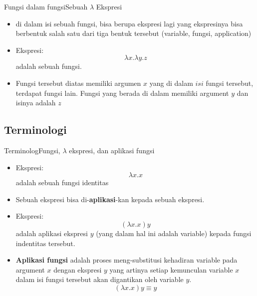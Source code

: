 \documentclass[aspectratio=1610,10pt,handout]{beamer}
\begin{document}
\begin{frame}{Fungsi dalam fungsi}{Sebuah $\lambda$ Ekspresi}

	\begin{itemize}
		\item<1-> di dalam isi sebuah fungsi, bisa berupa ekspresi lagi yang ekspresinya bisa berbentuk salah satu dari tiga bentuk tersebut (variable, fungsi, application)
		\item<2-> Ekspresi: $$\lambda x. \lambda y. z $$ adalah sebuah fungsi.
		\item<3-> Fungsi tersebut diatas memiliki argumen $x$ yang di dalam $isi$ fungsi tersebut, terdapat fungsi lain. Fungsi yang berada di dalam memiliki argument $y$ dan isinya adalah $z$
	\end{itemize}
\end{frame}

\subsection{Terminologi}
\begin{frame}{Terminolog}{Fungsi, $\lambda$ ekspresi,  dan aplikasi fungsi}

	\begin{itemize}
		\item<1-> Ekspresi: $$\lambda x. x$$ adalah sebuah fungsi identitas
		\item<2-> Sebuah ekspresi bisa di-{\bf aplikasi}-kan kepada sebuah ekspresi.
		\item<3-> Ekspresi: $$(\lambda x. x) y$$ adalah aplikasi ekspresi $y$
		(yang dalam hal ini adalah variable) kepada fungsi indentitas tersebut.
		\item<4-> {\bf Aplikasi fungsi} adalah proses meng-substitusi kehadiran variable pada argument $x$ dengan ekspresi $y$ yang artinya setiap kemunculan variable $x$ dalam isi fungsi tersebut akan digantikan oleh variable $y$.
		 $$(\lambda x. x) y \equiv y $$
	\end{itemize}
\end{frame}
\end{document}
